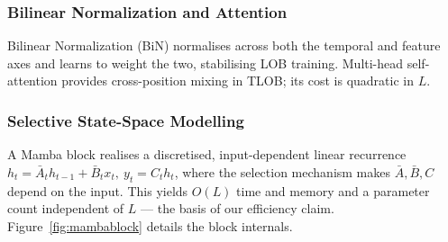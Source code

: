 \documentclass[11pt]{article}
\begin{document}
\subsubsection{Bilinear Normalization and Attention}
Bilinear Normalization (BiN) normalises across both the temporal and feature axes and learns to weight the
two, stabilising LOB training. Multi-head self-attention provides cross-position mixing in TLOB; its cost
is quadratic in $L$.

\subsubsection{Selective State-Space Modelling}
A Mamba block realises a discretised, input-dependent linear recurrence
$h_t = \bar{A}_t h_{t-1} + \bar{B}_t x_t,\ y_t = C_t h_t$, where the selection mechanism makes
$\bar A,\bar B,C$ depend on the input. This yields $O(L)$ time and memory and a parameter count independent
of $L$ --- the basis of our efficiency claim. Figure~\ref{fig:mambablock} details the block internals.
\end{document}
